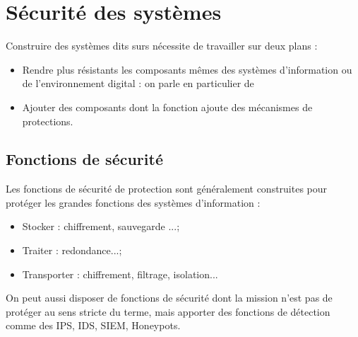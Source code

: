 
\section{Sécurité des systèmes }

Construire des systèmes dits surs  nécessite  de travailler sur deux plans :

\begin{itemize}
\item Rendre plus résistants les composants mêmes des systèmes d’information ou de l’environnement digital : on parle en particulier de 
\item Ajouter des composants dont la fonction ajoute des mécanismes de protections.
\end{itemize}

\subsection{Fonctions de sécurité}

Les fonctions de sécurité de protection sont généralement construites pour protéger les grandes fonctions des systèmes d’information :
\begin{itemize}
\item Stocker : chiffrement, sauvegarde ...;
\item Traiter : redondance...;
\item Transporter : chiffrement, filtrage, isolation...
\end{itemize}

On peut aussi disposer de fonctions de sécurité dont la mission n’est pas de protéger au sens stricte du terme, mais apporter des fonctions de détection comme des IPS, IDS, SIEM, Honeypots. 

\begin{nota}
\utodo
\end{nota}
\begin{nota}
\utodo
\end{nota}
\begin{nota}
\utodo
\end{nota}

